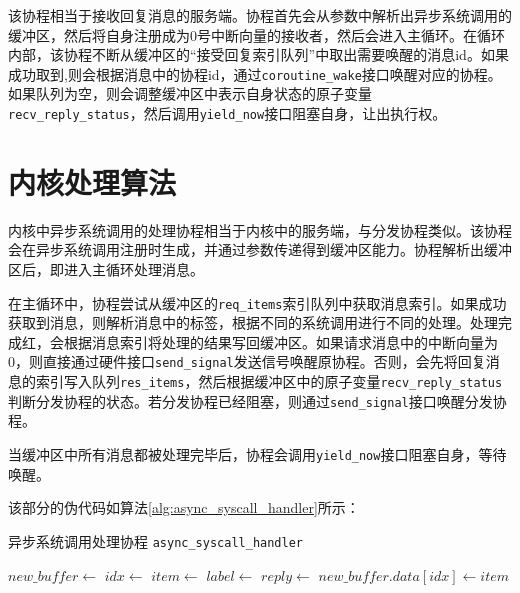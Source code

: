 该协程相当于接收回复消息的服务端。协程首先会从参数中解析出异步系统调用的缓冲区，然后将自身注册成为0号中断向量的接收者，然后会进入主循环。在循环内部，该协程不断从缓冲区的“接受回复索引队列”中取出需要唤醒的消息id。如果成功取到,则会根据消息中的协程id，通过\texttt{coroutine\_wake}接口唤醒对应的协程。如果队列为空，则会调整缓冲区中表示自身状态的原子变量
\texttt{recv\_reply\_status}，然后调用\texttt{yield\_now}接口阻塞自身，让出执行权。

\section{内核处理算法}

内核中异步系统调用的处理协程相当于内核中的服务端，与分发协程类似。该协程会在异步系统调用注册时生成，并通过参数传递得到缓冲区能力。协程解析出缓冲区后，即进入主循环处理消息。

在主循环中，协程尝试从缓冲区的\texttt{req\_items}索引队列中获取消息索引。如果成功获取到消息，则解析消息中的标签，根据不同的系统调用进行不同的处理。处理完成红，会根据消息索引将处理的结果写回缓冲区。如果请求消息中的中断向量为0，则直接通过硬件接口\texttt{send\_signal}发送信号唤醒原协程。否则，会先将回复消息的索引写入队列\texttt{res\_items}，然后根据缓冲区中的原子变量\texttt{recv\_reply\_status}判断分发协程的状态。若分发协程已经阻塞，则通过\texttt{send\_signal}接口唤醒分发协程。

当缓冲区中所有消息都被处理完毕后，协程会调用\texttt{yield\_now}接口阻塞自身，等待唤醒。

该部分的伪代码如算法\ref*{alg:async_syscall_handler}所示：

\begin{algorithm}[h]
  \caption{异步系统调用处理协程 \texttt{async\_syscall\_handler}}\label{alg:async_syscall_handler}
\begin{algorithmic}
    \State $new\_buffer \gets$ 
    \Loop
            \State $idx \gets$ 
            \State $item \gets$ 
            \State $label \gets$ 
            \State {}
            \State $reply \gets$ 
            \State $new\_buffer.data[idx] \gets item$
                \State {}
            \Else
                \State {}
                    \State {}
                    \State {}
                \EndIf
            \EndIf
        \Else
            \State {}
            \State {} 
        \EndIf
    \EndLoop
\EndFunction
\end{algorithmic}
\end{algorithm}



